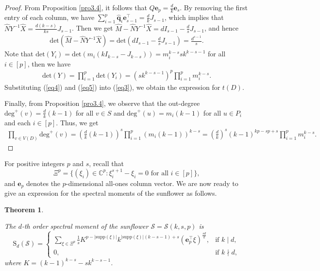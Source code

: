 \documentclass{article}
\newtheorem{thm}{Theorem}[section]
\begin{document}
\begin{proof}
From Proposition \ref{pro3.4},
it follows that $Q\mathbf{e}_p=\frac{d}{k}\mathbf{e}_s$.
By removing the first entry of each column, we have $\sum_{i=1}^{p}\hat{\mathbf{q}}_{i}\mathbf{e}_{s-1}^{\top}=\frac{d}{k}J_{s-1}$,
which implies that $\widehat{N}Y^{-1}\widehat{X}=\frac{d(k-s)}{ks}J_{s-1}$.
Then we get $\widehat{M}-\widehat{N}Y^{-1}\widehat{X}=dI_{s-1}-\frac{d}{s}J_{s-1}$, and hence
\begin{align}\label{eq4}
\mathrm{det}(\widehat{M}-\widehat{N}Y^{-1}\widehat{X})=\mathrm{det}(dI_{s-1}-\frac{d}{s}J_{s-1})=\frac{d^{s-1}}{s}.
\end{align}
Note that $\mathrm{det}(Y_{i})=\mathrm{det}(m_{i}(kI_{k-s}-J_{k-s}))=m_{i}^{k-s}sk^{k-s-1}$ for all $i \in [p]$,
then we have
\begin{align}\label{eq5}
\mathrm{det}(Y)=\prod_{i=1}^{p}\mathrm{det}(Y_{i})=(sk^{k-s-1})^{p}\prod_{i=1}^{p}m_{i}^{k-s}.
\end{align}
Substituting (\ref{eq4}) and (\ref{eq5}) into (\ref{eq3}),
we obtain the expression for $t(D)$.

Finally, from  Proposition \ref{pro3.4},
we observe that the out-degree $\mathrm{deg}^{+}(v)=\frac{d}{k}(k-1)$ for all $v \in S$
and $\mathrm{deg}^{+}(u)=m_{i}(k-1)$ for all $u \in P_{i}$ and each $i \in [p]$.
Thus, we get
\begin{align*}
\prod_{v\in V(D)}\mathrm{deg}^{+}(v)=(\frac{d}{k}(k-1))^{s}\prod_{i=1}^{p}(m_{i}(k-1))^{k-s}
=(\frac{d}{k})^s(k-1)^{kp-sp+s}\prod_{i=1}^{p}m_{i}^{k-s}.
\end{align*}
\end{proof}


For positive integers $p$ and $s$,
recall that
\[\Xi^{p}=\{(\xi_{i})\in\mathbb{C}^{p}: \mbox{$\xi_{i}^{s+1}-\xi_{i}=0$ for all $i\in[p]$}\},\]
and $\mathbf{e}_{p}$ denotes the $p$-dimensional all-ones column vector.
We are now ready to give an expression for the spectral moments of the sunflower as follows.


\begin{thm}\label{dingli2}

The $d$-th order spectral moment of the sunflower $\mathcal{S}=\mathcal{S}(k,s,p)$ is
\begin{equation*}
\mathrm{S}_{d}(\mathcal{S})=\begin{cases}
\sum_{\xi\in\Xi^{p}}\frac{1}{s}K^{p-|\mathrm{supp}(\xi)|}k^{|\mathrm{supp}(\xi)|(k-s-1)+s}(\mathbf{e}_{p}^{\top}\xi)^{\frac{sd}{k}},
&\text{if $k\mid d$},\\
0,
&\text{if $k\nmid d$},
\end{cases}
\end{equation*}
where $K=(k-1)^{k-s}-sk^{k-s-1}$.

\end{thm}
\end{document}
